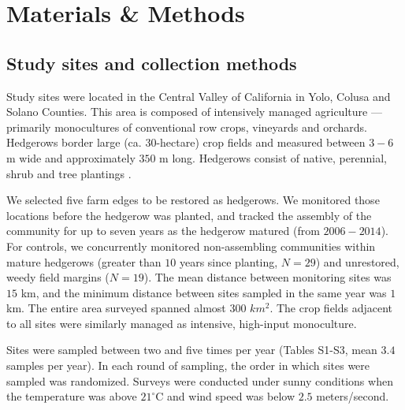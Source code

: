 \documentclass[12pt]{article}
\begin{document}

\section*{Materials \& Methods}
\label{sec:methods}

\subsection*{Study sites and collection methods}
\label{sec:study-sites}

Study sites were located in the Central Valley of California in Yolo,
Colusa and Solano Counties. This area is composed of intensively
managed agriculture --- primarily monocultures of conventional row
crops, vineyards and orchards. Hedgerows border large
(ca. $30$-hectare) crop fields and measured between $3-6$ m wide and
approximately $350$ m long. Hedgerows consist of native, perennial,
shrub and tree plantings \citep[Fig.~S1, ][]{menz-2010-4,
  kremen-2015-602, mgonigle-2015-x}.

We selected five farm edges to be restored as hedgerows. We monitored
those locations before the hedgerow was planted, and tracked the
assembly of the community for up to seven years as the hedgerow
matured (from $2006-2014$). For controls, we concurrently monitored
non-assembling communities within mature hedgerows (greater than $10$
years since planting, $N=29$) and unrestored, weedy field margins
($N=19$). The mean distance between monitoring sites was $15$ km, and
the minimum distance between sites sampled in the same year was $1$
km. The entire area surveyed spanned almost $300$ $km^2$. The crop
fields adjacent to all sites were similarly managed as intensive,
high-input monoculture.

Sites were sampled between two and five times per year (Tables S1-S3,
mean $3.4$ samples per year). In each round of sampling, the order in
which sites were sampled was randomized. Surveys were conducted under
sunny conditions when the temperature was above $21^{\circ}\mathrm{C}$
and wind speed was below $2.5$ meters/second.
\end{document}
